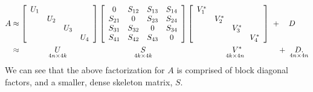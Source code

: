 \documentclass{sfuthesis}
\begin{document}
\begin{align}
	A &\approx \left[ \begin{array}{cccc}
                         U_1& & & \\
                               & U_2 & & \\
                               &         &U_3&\\
                               &         &          &U_4 
                               \end{array} \right] \left[\begin{array}{cccc}
                                                                  0&S_{12}& S_{13} &S_{14}\\
                                                                  S_{21}&0 & S_{23} &S_{24}\\
                                                                  S_{31}& S_{32} & 0& S_{34} \\
                                                                  S_{41}& S_{42} &S_{43}& 0
                                                                  \end{array}\right]
                                                             \left[\begin{array}{cccc}
                                                             V^*_1& & & \\
                               			         & V^*_2 & & \\
                               				&         &V^*_3&\\
                               				&         &          &V^*_4
                               				\end{array} \right]  \ +  \ \ \ D \nonumber \\
										&\approx \underset{4n \times 4k} { \hspace{1.5cm} U \hspace{1.5cm}  }\underset{4k \times 4k}{ \hspace{2.1cm} S  \hspace{2.1cm}  } \underset{4k \times 4n}{ \hspace{1.8cm} V^* \hspace{1.6cm} }+ \  \underset{4n \times 4n}{ D.} \label{eq: SingLevelFactorization} 
\end{align}
We can see that the above factorization for $A$ is comprised of block diagonal factors, and a smaller, dense skeleton matrix, $S$.
\end{document}
